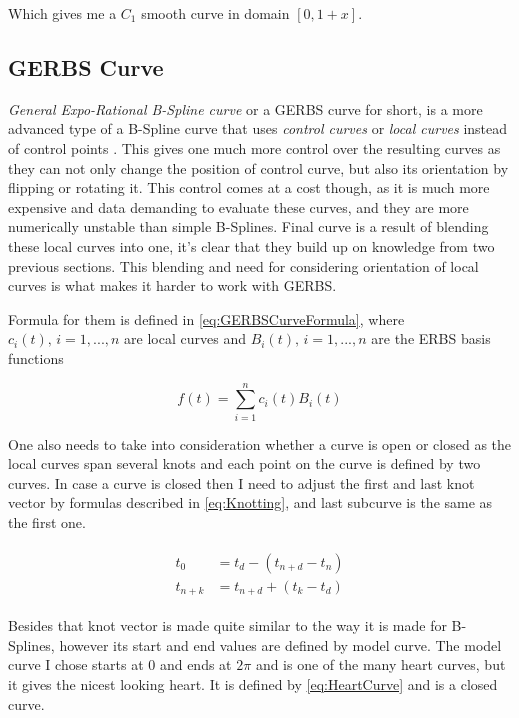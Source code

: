 \documentclass[a4paper,12pt]{extarticle}
\begin{document}
Which gives me a $C_1$ smooth curve in domain $[0,1+x]$.

\subsection{GERBS Curve}
\emph{General Expo-Rational B-Spline curve} or a GERBS curve for short, is a more advanced type of a B-Spline curve that uses \emph{control curves} or \emph{local curves} instead of control points . This gives one much more control over the resulting curves as they can not only change the position of control curve, but also its orientation by flipping or rotating it. This control comes at a cost though, as it is much more expensive and data demanding to evaluate these curves, and they are more numerically unstable than simple B-Splines. Final curve is a result of blending these local curves into one, it's clear that they build up on knowledge from two previous sections. This blending and need for considering orientation of local curves is what makes it harder to work with GERBS.

Formula for them is defined in \cref{eq:GERBSCurveFormula}, where $c_i(t), \, i=1,..., n$ are local curves and $B_i(t), \, i=1,..., n$ are the ERBS basis functions

\begin{equation}
f(t)= \sum_{i=1}^{n} c_i(t) B_i(t)
\label{eq:GERBSCurveFormula}
\end{equation}

One also needs to take into consideration whether a curve is open or closed as the local curves span several knots and each point on the curve is defined by two curves. In case a curve is closed then I need to adjust the first and last knot vector by formulas described in \cref{eq:Knotting}, and last subcurve is the same as the first one.

\begin{align}
\begin{split}
t_0&=t_d-(t_{n+d}-t_n)\\
t_{n+k}&=t_{n+d}+(t_k-t_d)
\label{eq:Knotting}
\end{split}
\end{align}

Besides that knot vector is made quite similar to the way it is made for B-Splines, however its start and end values are defined by model curve. The model curve I chose starts at $0$ and ends at $2\pi$ and is one of the many heart curves, but it gives the nicest looking heart. It is defined by \cref{eq:HeartCurve} \citep{Weisstein2018} and is a closed curve.
\end{document}
